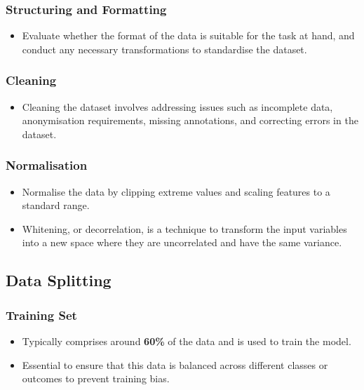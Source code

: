 \subsubsection*{Structuring and Formatting}
\begin{itemize}
    \item Evaluate whether the format of the data is suitable for the task at hand, and conduct any necessary transformations to standardise the dataset.
\end{itemize}

\subsubsection*{Cleaning}
\begin{itemize}
    \item Cleaning the dataset involves addressing issues such as incomplete data, anonymisation requirements, missing annotations, and correcting errors in the dataset.
\end{itemize}

\subsubsection*{Normalisation}
\begin{itemize}
    \item Normalise the data by clipping extreme values and scaling features to a standard range. 
    \item Whitening, or decorrelation, is a technique to transform the input variables into a new space where they are uncorrelated and have the same variance.
\end{itemize}

\subsection{Data Splitting}

\subsubsection*{Training Set}
\begin{itemize}
    \item Typically comprises around \textbf{60\%} of the data and is used to train the model. 
    \item Essential to ensure that this data is balanced across different classes or outcomes to prevent training bias.
\end{itemize}

